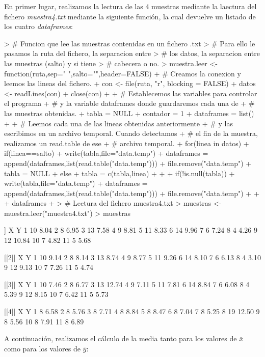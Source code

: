 \documentclass [a4paper] {article}
\begin{document}
En primer lugar, realizamos la lectura de las 4 muestras mediante la laectura del fichero \textit{muestra4.txt} mediante la siguiente función, la cual devuelve un listado de los cuatro \textit{dataframes}:
\begin{Schunk}
\begin{Sinput}
> # Funcion que lee las muestras contenidas en un fichero .txt
> # Para ello le pasamos la ruta del fichero, la separacion entre
> # los datos, la separacion entre las muestras (salto) y si tiene
> # cabecera o no.
> muestra.leer <- function(ruta,sep=" ",salto="",header=FALSE){
+   # Creamos la conexion y leemos las lineas del fichero.
+ 	con <- file(ruta, "r", blocking = FALSE)
+ 	datos <- readLines(con)
+ 	close(con)
+ 	
+ 	# Establecemos las variables para controlar el programa
+ 	# y la variable dataframes donde guardaremos cada una de
+ 	# las muestras obtenidas.
+ 	tabla = NULL
+ 	contador = 1
+ 	dataframes = list()
+ 
+ 	# Leemos cada una de las lineas obtenidas anteriormente
+ 	# y las escribimos en un archivo temporal. Cuando detectamos
+ 	# el fin de la muestra, realizamos un read.table de ese
+ 	# archivo temporal.
+ 	for(linea in datos){
+ 		if(linea==salto){
+ 			write(tabla,file="data.temp")
+ 			dataframes = append(dataframes,list(read.table("data.temp")))
+ 			file.remove("data.temp")
+ 			tabla = NULL
+ 		} else{
+ 			tabla = c(tabla,linea)
+ 		}
+ 	}
+ 	if(!is.null(tabla)){
+ 		write(tabla,file="data.temp")
+ 		dataframes = append(dataframes,list(read.table("data.temp")))
+ 		file.remove("data.temp")
+ 	}
+ 
+ 	dataframes
+ }
> # Lectura del fichero muestra4.txt
> muestras <- muestra.leer("muestra4.txt")
> muestras
\end{Sinput}
\begin{Soutput}
[[1]]
    X     Y
1  10  8.04
2   8  6.95
3  13  7.58
4   9  8.81
5  11  8.33
6  14  9.96
7   6  7.24
8   4  4.26
9  12 10.84
10  7  4.82
11  5  5.68

[[2]]
    X    Y
1  10 9.14
2   8 8.14
3  13 8.74
4   9 8.77
5  11 9.26
6  14 8.10
7   6 6.13
8   4 3.10
9  12 9.13
10  7 7.26
11  5 4.74

[[3]]
    X     Y
1  10  7.46
2   8  6.77
3  13 12.74
4   9  7.11
5  11  7.81
6  14  8.84
7   6  6.08
8   4  5.39
9  12  8.15
10  7  6.42
11  5  5.73

[[4]]
    X     Y
1   8  6.58
2   8  5.76
3   8  7.71
4   8  8.84
5   8  8.47
6   8  7.04
7   8  5.25
8  19 12.50
9   8  5.56
10  8  7.91
11  8  6.89
\end{Soutput}
\end{Schunk}
A continuación, realizamos el cálculo de la media tanto para los valores de $\bar{x}$ como para los valores de $\bar{y}$:
\end{document}
